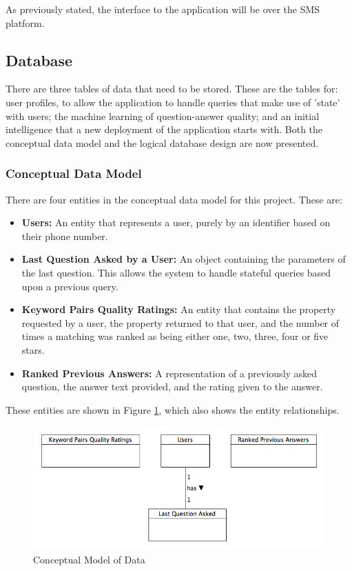 \documentclass[authoryearcitations]{UoYCSproject}
\begin{document}
As previously stated, the interface to the application will be over the SMS platform.

\subsection{Database}
There are three tables of data that need to be stored.  These are the tables for: user profiles, to allow the application to handle queries that make use of 'state' with users; the machine learning of question-answer quality; and an initial intelligence that a new deployment of the application starts with.  Both the conceptual data model and the logical database design are now presented.

\subsubsection{Conceptual Data Model}
There are four entities in the conceptual data model for this project.  These are:

\begin{itemize}
  \item {\bf Users:} An entity that represents a user, purely by an identifier based on their phone number.
  \item {\bf Last Question Asked by a User:} An object containing the parameters of the last question.  This allows the system to handle stateful queries based upon a previous query.
  \item {\bf Keyword Pairs Quality Ratings:} An entity that contains the property requested by a user, the property returned to that user, and the number of times a matching was ranked as being either one, two, three, four or five stars.
  \item {\bf Ranked Previous Answers:} A representation of a previously asked question, the answer text provided, and the rating given to the answer.
\end{itemize}

These entities are shown in Figure \ref{fig:conceptualDatabaseDesignDiagram}, which also shows the entity relationships.

\begin{figure}[htb] 
\includegraphics[width=\linewidth]{conceptualModel}
\caption{Conceptual Model of Data}
\label{fig:conceptualDatabaseDesignDiagram}
\end{figure}
\end{document}
